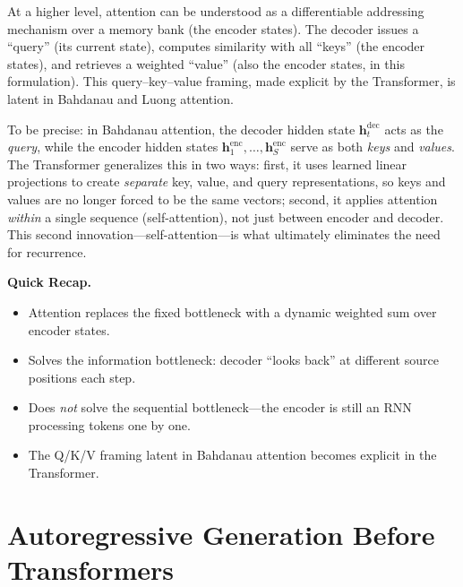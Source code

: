At a higher level, attention can be understood as a differentiable addressing mechanism over a memory bank (the encoder states). The decoder issues a ``query'' (its current state), computes similarity with all ``keys'' (the encoder states), and retrieves a weighted ``value'' (also the encoder states, in this formulation). This query--key--value framing, made explicit by the Transformer, is latent in Bahdanau and Luong attention.

To be precise: in Bahdanau attention, the decoder hidden state $\mathbf{h}_t^{\text{dec}}$ acts as the \emph{query}, while the encoder hidden states $\mathbf{h}_1^{\text{enc}}, \ldots, \mathbf{h}_S^{\text{enc}}$ serve as both \emph{keys} and \emph{values}. The Transformer generalizes this in two ways: first, it uses learned linear projections to create \emph{separate} key, value, and query representations, so keys and values are no longer forced to be the same vectors; second, it applies attention \emph{within} a single sequence (self-attention), not just between encoder and decoder. This second innovation---self-attention---is what ultimately eliminates the need for recurrence.

\medskip
\noindent{}
\medskip

\begin{quickrecap}
\textbf{Quick Recap.}
\begin{itemize}[nosep,leftmargin=1.5em]
  \item Attention replaces the fixed bottleneck with a dynamic weighted sum over encoder states.
  \item Solves the information bottleneck: decoder ``looks back'' at different source positions each step.
  \item Does \emph{not} solve the sequential bottleneck---the encoder is still an RNN processing tokens one by one.
  \item The Q/K/V framing latent in Bahdanau attention becomes explicit in the Transformer.
\end{itemize}
\end{quickrecap}

\section{Autoregressive Generation Before Transformers}

